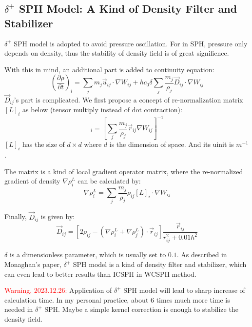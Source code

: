 \subsection{$\delta^+$ SPH Model: A Kind of Density Filter and Stabilizer}

$\delta^+$ SPH model is adopted to avoid pressure oscillation.
For in SPH, pressure only depends on density, 
thus the stability of density field is of great significnce.

With this in mind, an additional part is added to continuity equation:
\begin{equation}
    \left(
        \frac{\partial \rho}{\partial t}
    \right)_i
    =
    \sum_j m_j \vec{u}_{ij} \cdot \nabla W_{ij}
    +
    h c_0 \delta
    \sum_j  \frac{m_j}{\rho_j} \vec{D}_{ij}\cdot \nabla W_{ij}
\end{equation}
$\vec{D}_{ij}$'s part is complicated. We first propose a concept of re-normalization matrix 
$[L]_i$ as below (tensor multiply instead of dot contraction):
\begin{equation}
    [L]_i = \left[\sum_j \frac{m_j}{\rho_j}\vec{r}_{ij}\nabla W_{ij}\right]^{-1}
\end{equation}
$[L]_i$ has the size of $d\times d$ where $d$ is the dimension of space.
And its uinit is $m^{-1}$.

The matrix is a kind of local gradient operator matrix, 
where the re-normalized gradient of density $\nabla \rho_i^L$ can be calculated by:
\begin{equation}
    \nabla \rho_i^L = \sum_j \frac{m_j}{\rho_j}\rho_{ij}
    [L]_i \cdot \nabla W_{ij}
\end{equation}

Finally, $\vec{D}_{ij}$ is given by:
\begin{equation}
    \vec{D}_{ij} = 
    \left[
        2\rho_{ij} - 
        \left(
            \nabla \rho_i^L + \nabla \rho_j^L
        \right)\cdot \vec{r}_{ij}
    \right]
    \frac{\vec{r}_{ij}}{r_{ij}^2 + 0.01h^2}
\end{equation}

$\delta$ is a dimensionless parameter, 
which is usually set to $0.1$.
As described in Monaghan's paper,
$\delta^+$ SPH model is a kind of density filter and stabilizer,
which can even lead to better results than ICSPH in WCSPH method.

\textcolor{red}{Warning, 2023.12.26:} Application of $\delta^+$ SPH model 
will lead to sharp increase of calculation time.
In my personal practice, 
about 6 times much more time is needed in $\delta^+$ SPH.
Maybe a simple kernel correction is enough to stabilize the density field.